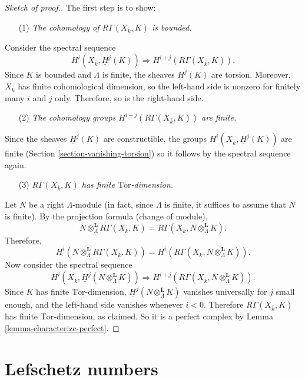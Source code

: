 \begin{proof}[Sketch of proof.]
The first step is to show:
\begin{enumerate}
\item[(1)]
{\it The cohomology of $R\Gamma(X_{\bar k}, K)$ is bounded.}
\end{enumerate}
Consider the spectral sequence
$$
H^i(X_{\bar k}, \underline H^j(K))
\Rightarrow
H^{i+j} (R\Gamma(X_{\bar k}, K)).
$$
Since $K$ is bounded and $\Lambda$ is finite, the sheaves $\underline H^j(K)$
are torsion. Moreover, $X_{\bar k}$ has finite cohomological dimension, so the
left-hand side is nonzero for finitely many $i$ and $j$ only. Therefore, so is
the right-hand side.
\begin{enumerate}
\item[(2)]
{\it The cohomology groups $H^{i+j} (R\Gamma(X_{\bar k}, K))$ are finite.}
\end{enumerate}
Since the sheaves $\underline H^j(K)$ are constructible, the groups
$H^i(X_{\bar k}, \underline H^j(K))$ are finite
(Section \ref{section-vanishing-torsion}) so
it follows by the spectral sequence again.
\begin{enumerate}
\item[(3)]
{\it $R\Gamma(X_{\bar k}, K)$ has finite $\text{Tor}$-dimension.}
\end{enumerate}
Let $N$ be a right $\Lambda$-module (in fact, since $\Lambda$ is finite, it
suffices to assume that $N$ is finite). By the projection formula (change of
module),
$$
N \otimes^\mathbf{L}_\Lambda R \Gamma(X_{\bar k}, K) = R\Gamma(X_{\bar k},
N \otimes^\mathbf{L}_\Lambda K).
$$
Therefore,
$$
H^i (N \otimes^\mathbf{L}_\Lambda R\Gamma(X_{\bar k}, K)) = H^i(R\Gamma(X_{\bar
k}, N \otimes_{\Lambda}^\mathbf{L} K)).
$$
Now consider the spectral sequence
$$
H^i (X_{\bar k}, \underline H^j (N \otimes_{\Lambda}^\mathbf{L} K))
\Rightarrow
H^{i+j}(R\Gamma(X_{\bar k}, N \otimes_{\Lambda}^\mathbf{L} K)).
$$
Since $K$ has finite $\text{Tor}$-dimension, $\underline H^j
(N \otimes_{\Lambda}^\mathbf{L} K)$ vanishes universally for $j$ small enough,
and the left-hand side vanishes whenever $i < 0$. Therefore $R\Gamma(X_{\bar
k}, K)$ has finite $\text{Tor}$-dimension, as claimed. So it is a perfect
complex by Lemma \ref{lemma-characterize-perfect}.
\end{proof}





\section{Lefschetz numbers}
\label{section-lefschetz-numbers}

